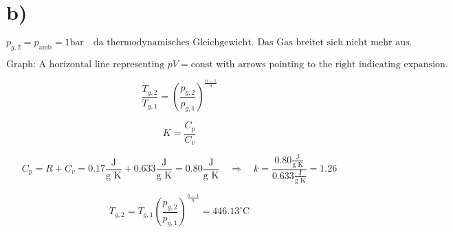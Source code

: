 

\section*{b)}

\[
p_{g,2} = p_{\text{amb}} = 1 \text{bar} \quad \text{da thermodynamisches Gleichgewicht. Das Gas breitet sich nicht mehr aus.}
\]

\[
\text{Graph: A horizontal line representing } pV = \text{const} \text{ with arrows pointing to the right indicating expansion.}
\]

\[
\frac{T_{g,2}}{T_{g,1}} = \left( \frac{p_{g,2}}{p_{g,1}} \right)^{\frac{n-1}{n}}
\]

\[
K = \frac{C_p}{C_v}
\]

\[
C_p = R + C_v = 0.17 \frac{\text{J}}{\text{g K}} + 0.633 \frac{\text{J}}{\text{g K}} = 0.80 \frac{\text{J}}{\text{g K}} \quad \Rightarrow \quad k = \frac{0.80 \frac{\text{J}}{\text{g K}}}{0.633 \frac{\text{J}}{\text{g K}}} = 1.26
\]

\[
T_{g,2} = T_{g,1} \left( \frac{p_{g,2}}{p_{g,1}} \right)^{\frac{n-1}{n}} = 446.13^\circ \text{C}
\]